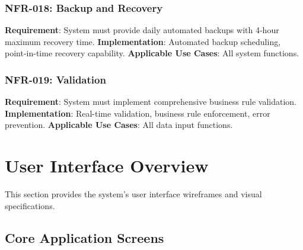 \documentclass[12pt,a4paper]{article}
\begin{document}
\subsubsection{NFR-018: Backup and Recovery}
\textbf{Requirement}: System must provide daily automated backups with 4-hour maximum recovery time.
\textbf{Implementation}: Automated backup scheduling, point-in-time recovery capability.
\textbf{Applicable Use Cases}: All system functions.

\subsubsection{NFR-019: Validation}
\textbf{Requirement}: System must implement comprehensive business rule validation.
\textbf{Implementation}: Real-time validation, business rule enforcement, error prevention.
\textbf{Applicable Use Cases}: All data input functions.

\section{User Interface Overview}

This section provides the system's user interface wireframes and visual specifications.

\subsection{Core Application Screens}
\end{document}
